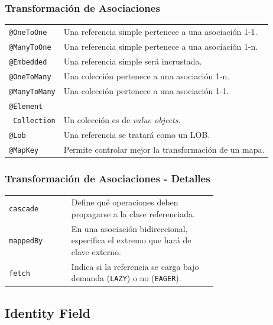 \documentclass[a4paper,slidestop,xcolor=pst,blue]{beamer}
\newcommand{\ann}[1]{\color{blue}\texttt{#1}\color{black}}
\begin{document}
\begin{frame}[c]
    \frametitle{Transformación de Asociaciones}
    \begin{tabular}{ll}
        \ann{@OneToOne}   & Una referencia simple pertenece a una asociación 1-1. \\
        \ann{@ManyToOne}  & Una referencia simple pertenece a una asociación 1-n. \\
        \ann{@Embedded}   & Una referencia simple será incrustada. \\
        \ann{@OneToMany}  & Una colección pertenece a una asociación 1-n. \\
        \ann{@ManyToMany} & Una colección pertenece a una asociación 1-1. \\
        \ann{@Element}    &  \\
        \multicolumn{1}{r}{\ann{Collection}} & Un colección es de \emph{value objects}. \\
        \ann{@Lob}        & Una referencia se tratará como un LOB. \\
        \ann{@MapKey}     & Permite controlar mejor la transformación de un mapa. \\
    \end{tabular}
\end{frame}

\begin{frame}[c]
    \frametitle{Transformación de Asociaciones - Detalles}
    \begin{tabular}{lp{0.70\linewidth}}
        \ann{cascade}  & Define qué operaciones deben propagarse a la clase referenciada. \\
        \ann{mappedBy} & En una asociación bidireccional, especifica el extremo que hará de clave externo. \\
        \ann{fetch}    & Indica si la referencia se carga bajo demanda (\ann{LAZY}) o no (\ann{EAGER}). \\
    \end{tabular}
\end{frame}

\subsection{Identity Field}
\end{document}
